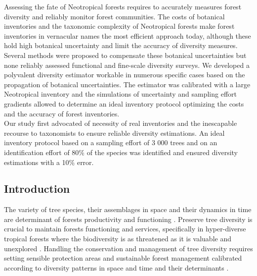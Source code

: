 \documentclass[
  11pt,
  french,
  A4paper,
  extrafontsizes,onecolumn,openright
  ]{memoir}
\begin{document}
Assessing the fate of Neotropical forests requires to accurately
measures forest diversity and reliably monitor forest communities. The
costs of botanical inventories and the taxonomic complexity of
Neotropical forests make forest inventories in vernacular names the most
efficient approach today, although these hold high botanical uncertainty
and limit the accuracy of diversity measures. Several methods were
proposed to compensate these botanical uncertainties but none reliably
assessed functional and fine-scale diversity surveys. We developed a
polyvalent diversity estimator workable in numerous specific cases based
on the propagation of botanical uncertainties. The estimator was
calibrated with a large Neotropical inventory and the simulations of
uncertainty and sampling effort gradients allowed to determine an ideal
inventory protocol optimizing the costs and the accuracy of forest
inventories.\\
Our study first advocated of necessity of real inventories and the
inescapable recourse to taxonomists to ensure reliable diversity
estimations. An ideal inventory protocol based on a sampling effort of 3
000 trees and on an identification effort of 80\% of the species was
identified and ensured diversity estimations with a 10\% error.

\subsection{Introduction}\label{introduction}

The variety of tree species, their assemblages in space and their
dynamics in time are determinant of forests productivity and functioning
\autocite{Cardinale2012}. Preserve tree diversity is crucial to maintain
forests functioning and services, specifically in hyper-diverse tropical
forests where the biodiversity is as threatened as it is valuable and
unexplored \autocite{Barlow2018}. Handling the conservation and
management of tree diversity requires setting sensible protection areas
and sustainable forest management calibrated according to diversity
patterns in space and time and their determinants
\autocites{Margules2000}{Purvis2000}{Gibson2011}{FAO2014}{Sist2015}.
\end{document}
